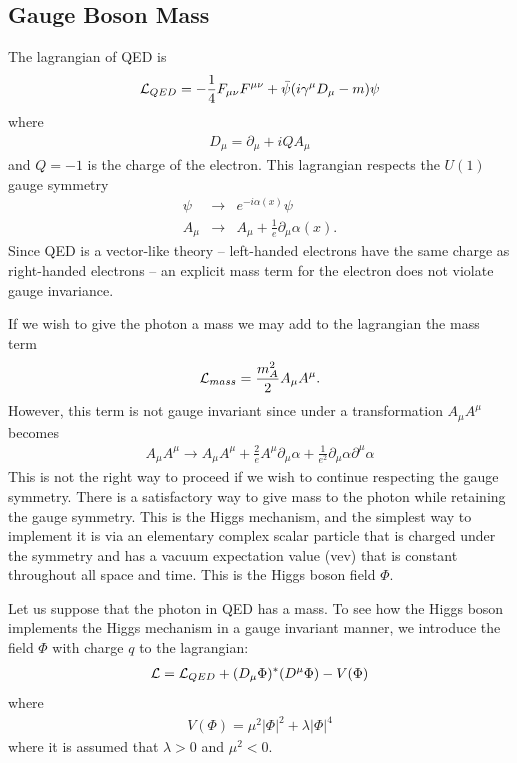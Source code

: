 \documentclass[12pt]{article}
\def\beq{\begin{eqnarray}}
\def\eeq{\end{eqnarray}}
\def\bea{\begin{eqnarray}}
\def\Dslash{\gamma^\mu D_\mu}
\begin{document}
\noindent
\subsection{Gauge Boson Mass}

The lagrangian of QED is
\beq
{\cal L}_{QED}=-\frac{1}{4}F_{\mu\nu}F^{\mu\nu}+\bar \psi (i\Dslash -m)\psi
\eeq
where 
\beq
D_\mu=\partial_\mu +iQA_\mu
\eeq
and $Q=-1$ is the charge of the electron.
This lagrangian respects the $U(1)$ gauge symmetry
\bea
\psi & \to & e^{-i\alpha(x)}\psi \\
A_\mu & \to & A_\mu+\frac{1}{e}\partial_\mu \alpha(x).
\eeq
Since QED is a vector-like theory -- left-handed electrons have the same charge as right-handed electrons --  an explicit mass term for the electron does not violate gauge invariance. 

If we wish to give the photon a mass we may add to the lagrangian the mass term
\beq
{\cal L}_{mass}=\frac{m_A^2}{2}A_\mu A^\mu .
\eeq
However, this term is not gauge invariant since under a transformation $A_\mu A^\mu$ becomes
\beq
A_\mu A^\mu\to A_\mu A^\mu+\frac{2}{e}A^\mu\partial_\mu\alpha+\frac{1}{e^2}\partial_\mu \alpha\partial^\mu\alpha
\eeq
This is not the right way to proceed if we wish to continue respecting the gauge symmetry. 
There is a satisfactory way to give mass to the photon while retaining the gauge symmetry. This is the Higgs mechanism, and the simplest way to implement it is via an elementary complex scalar particle that is charged under the symmetry and has a vacuum expectation value (vev) that is constant throughout all space and time.  This is the Higgs boson field $\Phi$.

Let us suppose that the photon in QED has a mass. To see how the Higgs boson implements the Higgs mechanism in a gauge invariant manner,  we 
introduce the field $\Phi$ with charge $q$  to the lagrangian:
\beq
{\cal L}={\cal L}_{QED}+(D_\mu\Phi)^*(D^\mu \Phi)-V(\Phi)
\eeq
where 
\beq
V(\Phi)=\mu^2|\Phi|^2+\lambda |\Phi|^4
\eeq
where it is assumed that $\lambda>0$ and $\mu^2<0$.  
\end{document}
